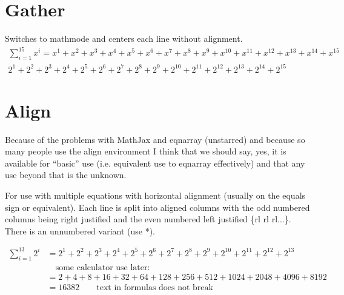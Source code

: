 \section[Gather]{Gather}


Switches to mathmode and centers each line without alignment.
\begin{gather}
\label{gathereq} \sum_{i=1}^{15} x^i = x^1 + x^2 + x^3 + x^4 + x^5 + x^6 + x^7 + x^8 + x^9 + x^{10} + x^{11} + x^{12} + x^{13} + x^{14} + x^{15}\\%
2^1 + 2^2 + 2^3 + 2^4 + 2^5 + 2^6 + 2^7 + 2^8 + 2^9 + 2^{10} + 2^{11} + 2^{12} + 2^{13} + 2^{14} + 2^{15}\nonumber %
\end{gather}


\section[Align]{Align}

Because of the problems with MathJax and eqnarray (unstarred) and because so many people use the align environment I think that we should say, yes, it is available for ``basic'' use (i.e. equivalent use to eqnarray effectively) and that any use beyond that is the unknown. 

For use with multiple equations with horizontal alignment (usually on the equals sign or equivalent). Each line is split into aligned columns with the odd numbered columns being right justified and the even numbered left justified \{rl rl rl...\}. There is an unnumbered variant (use *). 

\begin{align}
\label{alignlab} \sum_{i=1}^{13} 2^i &= 2^1 + 2^2 + 2^3 + 2^4 + 2^5 + 2^6 + 2^7 + 2^8 + 2^9 + 2^{10} + 2^{11} + 2^{12} + 2^{13}\\%
&\quad \text{some calculator use later:}\nonumber\\
&=2 + 4 + 8 + 16 + 32 + 64 + 128 + 256 + 512 + 1024 + 2048 + 4096 + 8192 \nonumber\\%
&=16382 \qquad\text{text in formulas does not break} %
\end{align}


